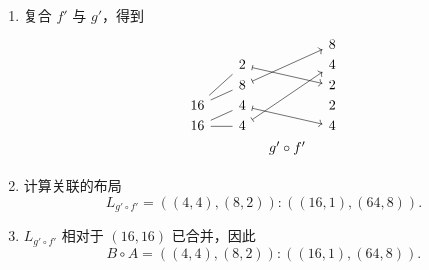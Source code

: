 \begin{example}
\begin{enumerate}
        \item 复合 $f'$ 与 $g'$，得到
        \[ \begin{tikzcd} [row sep = 1, column sep = 8]
        & & & & 8\\
        & & 2 \ar[drr,mapsto] & & 4 \\
        & & 8 \ar[uurr,mapsto] & & 2\\
        16 \ar[urr,-] \ar[uurr,-] & & 4 \ar[drr,mapsto] & & 2\\
        16 \ar[rr,-] \ar[urr,-] & & 4 \ar[uuurr,mapsto] & & 4\\
        & & & g' \circ f'& \\
        \end{tikzcd} \]
        \item 计算关联的布局
        \[
        L_{g' \circ f'} = ((4,4),(8,2)):((16,1),(64,8)).
        \]
        \item $L_{g' \circ f'}$ 相对于 $(16,16)$ 已合并，因此
        \[
        B \circ A = ((4,4),(8,2)):((16,1),(64,8)).
        \]
    \end{enumerate}
\end{example}



